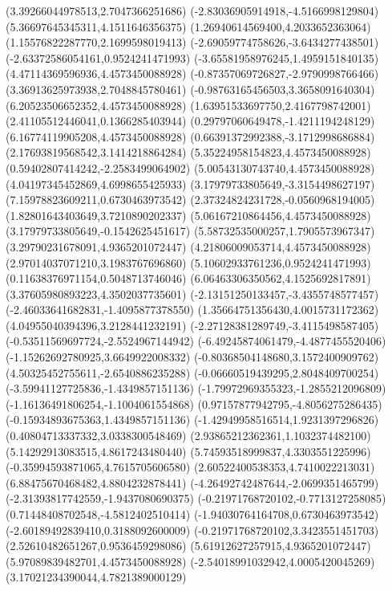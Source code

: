 {(3.39266044978513,2.7047366251686)
(-2.83036905914918,-4.5166998129804)
(5.36697645345311,4.1511646356375)
(1.26940614569400,4.2033652363064)
(1.15576822287770,2.1699598019413)
(-2.69059774758626,-3.6434277438501)
(-2.63372586054161,0.9524241471993)
(-3.65581958976245,1.4959151840135)
(4.47114369596936,4.4573450088928)
(-0.87357069726827,-2.9790998766466)
(3.36913625973938,2.7048845780461)
(-0.98763165456503,3.3658091640304)
(6.20523506652352,4.4573450088928)
(1.63951533697750,2.4167798742001)
(2.41105512446041,0.1366285403944)
(0.29797060649478,-1.4211194248129)
(6.16774119905208,4.4573450088928)
(0.66391372992388,-3.1712998686884)
(2.17693819568542,3.1414218864284)
(5.35224958154823,4.4573450088928)
(0.59402807414242,-2.2583499064902)
(5.00543130743740,4.4573450088928)
(4.04197345452869,4.6998655425933)
(3.17979733805649,-3.3154498627197)
(7.15978823609211,0.6730463973542)
(2.37324824231728,-0.0560968194005)
(1.82801643403649,3.7210890202337)
(5.06167210864456,4.4573450088928)
(3.17979733805649,-0.1542625451617)
(5.58732535000257,1.7905573967347)
(3.29790231678091,4.9365201072447)
(4.21806009053714,4.4573450088928)
(2.97014037071210,3.1983767696860)
(5.10602933761236,0.9524241471993)
(0.11638376971154,0.5048713746046)
(6.06463306350562,4.1525692817891)
(3.37605980893223,4.3502037735601)
(-2.13151250133457,-3.4355748577457)
(-2.46033641682831,-1.4095877378550)
(1.35664751356430,4.0015731172362)
(4.04955040394396,3.2128441232191)
(-2.27128381289749,-3.4115498587405)
(-0.53511569697724,-2.5524967144942)
(-6.49245874061479,-4.4877455520406)
(-1.15262692780925,3.6649922008332)
(-0.80368504148680,3.1572400909762)
(4.50325452755611,-2.6540886235288)
(-0.06660519439295,2.8048409700254)
(-3.59941127725836,-1.4349857151136)
(-1.79972969355323,-1.2855212096809)
(-1.16136491806254,-1.1004061554868)
(0.97157877942795,-4.8056275286435)
(-0.15934893675363,1.4349857151136)
(-1.42949958516514,1.9231397296826)
(0.40804713337332,3.0338300548469)
(2.93865212362361,1.1032374482100)
(5.14292913083515,4.8617243480440)
(5.74593518999837,4.3303551225996)
(-0.35994593871065,4.7615705606580)
(2.60522400538353,4.7410022213031)
(6.88475670468482,4.8804232878441)
(-4.26492742487644,-2.0699351465799)
(-2.31393817742559,-1.9437080690375)
(-0.21971768720102,-0.7713127258085)
(0.71448408702548,-4.5812402510414)
(-1.94030764164708,0.6730463973542)
(-2.60189492839410,0.3188092600009)
(-0.21971768720102,3.3423551451703)
(2.52610482651267,0.9536459298086)
(5.61912627257915,4.9365201072447)
(5.97089839482701,4.4573450088928)
(-2.54018991032942,4.0005420045269)
(3.17021234390044,4.7821389000129)
}
